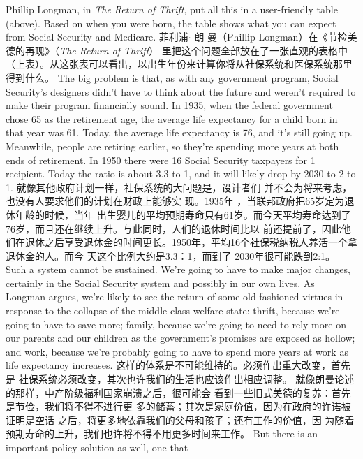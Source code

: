 \begin{paracol}{2}
Phillip Longman, in \textit{The Return of Thrift}, put all this in a user-friendly table (above). Based on when you were born, the table
shows what you can expect from Social Security and Medicare.
\switchcolumn
菲利浦$\cdot$ 朗 曼（Phillip Longman）在《节检美德的再现》（\textit{The Return of Thrift}） 里把这个问题全部放在了一张直观的表格中 （上表）。从这张表可以看出，以出生年份来计算你将从社保系统和医保系统那里得到什么。
\switchcolumn*
The big problem is that, as with any government program,
Social Security's designers didn't have to think about the future
and weren't required to make their program financially sound.
In 1935, when the federal government chose 65 as the retirement age, the average life expectancy for a child born in that
year was 61. Today, the average life expectancy is 76, and it's
still going up. Meanwhile, people are retiring earlier, so they're
spending more years at both ends of retirement. In 1950 there
were 16 Social Security taxpayers for 1 recipient. Today the
ratio is about 3.3 to 1, and it will likely drop by 2030 to 2 to 1.	
\switchcolumn
就像其他政府计划一样，社保系统的大问题是，设计者们
并不会为将来考虑，也没有人要求他们的计划在财政上能够实
现。1935年 ，当联邦政府把65岁定为退休年龄的时候，当年
出生婴儿的平均预期寿命只有61岁。而今天平均寿命达到了
76岁，而且还在继续上升。与此同时，人们的退休时间比以
前还提前了，因此他们在退休之后享受退休金的时间更长。1950年，平均16个社保税纳税人养活一个拿退休金的人。而今
天这个比例大约是3.3：1，而到了 2030年很可能跌到2:1。
\switchcolumn*
Such a system cannot be sustained. We're going to have to
make major changes, certainly in the Social Security system and
possibly in our own lives. As Longman argues, we're likely to
see the return of some old-fashioned virtues in response to the
collapse of the middle-class welfare state: thrift, because we're
going to have to save more; family, because we're going to need
to rely more on our parents and our children as the government's promises are exposed as hollow; and work, because we're
probably going to have to spend more years at work as life expectancy increases.
\switchcolumn
这样的体系是不可能维持的。必须作出重大改变，首先是
社保系统必须改变，其次也许我们的生活也应该作出相应调整。
就像朗曼论述的那样，中产阶级福利国家崩溃之后，很可能会
看到一些旧式美德的复苏：首先是节俭，我们将不得不进行更
多的储蓄；其次是家庭价值，因为在政府的许诺被证明是空话
之后，将更多地依靠我们的父母和孩子；还有工作的价值，因
为随着预期寿命的上升，我们也许将不得不用更多时间来工作。
\switchcolumn*
But there is an important policy solution as well, one that

\end{paracol}
